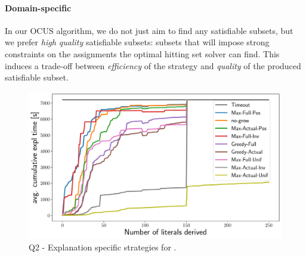 \paragraph{Domain-specific \grow} 
In our OCUS algorithm, we do not just aim to find any satisfiable subsets, but we prefer \emph{high quality} satisfiable subsets: subsets that will impose strong constraints on the assignments the optimal hitting set solver can find. 
This induces a trade-off between \emph{efficiency} of the \grow strategy and \emph{quality} of the produced satisfiable subset.

\begin{figure}[ht]
  \centering
  \includegraphics[width=\columnwidth]{figures_post_paper/new_cumul_grow_avg_time_lits_derived.pdf}
  \caption{Q2 - Explanation specific \grow strategies for \comus.}
  \label{fig:grow_strategies}
\end{figure}


